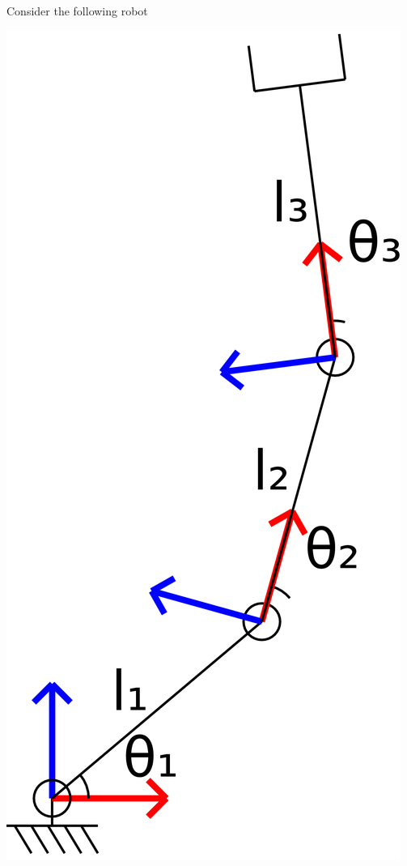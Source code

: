 \documentclass{16384_doc} %
\begin{document}
\begin{questions}
\begin{enumerate} [label=\alph*.]
    \end{enumerate}

    Consider the following robot
    \begin{center}
    \includegraphics[scale=0.07]{generated_figures/RRR_nonsingular.png}
    \end{center}


\end{questions}
\end{document}
